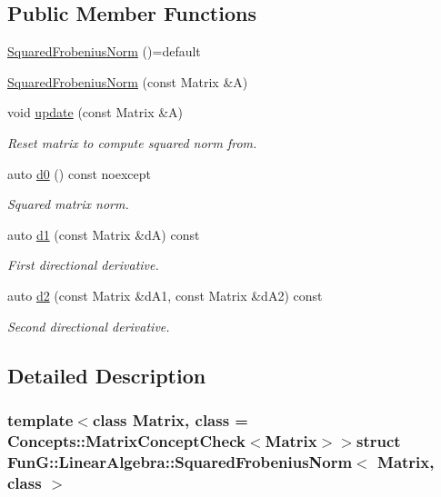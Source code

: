 \subsection*{Public Member Functions}
\begin{DoxyCompactItemize}
\item 
\hyperlink{structFunG_1_1LinearAlgebra_1_1SquaredFrobeniusNorm_ae9dfaea546dd55106ab886a10a255792}{Squared\-Frobenius\-Norm} ()=default
\item 
\hyperlink{structFunG_1_1LinearAlgebra_1_1SquaredFrobeniusNorm_af33cdb4a7282ceb03b707ff7fa85ebe4}{Squared\-Frobenius\-Norm} (const Matrix \&A)
\item 
void \hyperlink{structFunG_1_1LinearAlgebra_1_1SquaredFrobeniusNorm_ac4c6dbd6c3beb28d1f77b3e1367d70b6}{update} (const Matrix \&A)
\begin{DoxyCompactList}\small\item\em Reset matrix to compute squared norm from. \end{DoxyCompactList}\item 
auto \hyperlink{structFunG_1_1LinearAlgebra_1_1SquaredFrobeniusNorm_af0315a30be696111d572313dc16ef0f5}{d0} () const noexcept
\begin{DoxyCompactList}\small\item\em Squared matrix norm. \end{DoxyCompactList}\item 
auto \hyperlink{structFunG_1_1LinearAlgebra_1_1SquaredFrobeniusNorm_aba96a8b0e500268388d8dc2751188673}{d1} (const Matrix \&d\-A) const 
\begin{DoxyCompactList}\small\item\em First directional derivative. \end{DoxyCompactList}\item 
auto \hyperlink{structFunG_1_1LinearAlgebra_1_1SquaredFrobeniusNorm_a052a1615f0a6f2a0e66dba2370f7e255}{d2} (const Matrix \&d\-A1, const Matrix \&d\-A2) const 
\begin{DoxyCompactList}\small\item\em Second directional derivative. \end{DoxyCompactList}\end{DoxyCompactItemize}


\subsection{Detailed Description}
\subsubsection*{template$<$class Matrix, class = Concepts\-::\-Matrix\-Concept\-Check$<$\-Matrix$>$$>$struct Fun\-G\-::\-Linear\-Algebra\-::\-Squared\-Frobenius\-Norm$<$ Matrix, class $>$}

